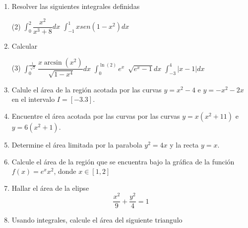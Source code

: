 \documentclass[12pt]{article}
\newenvironment{preguntas}
{\begin{enumerate}\itemsep12pt
	}
	{
	\end{enumerate}
}
\begin{document}
\begin{preguntas}
\begin{tasks}
\task $\displaystyle\int (x+2)sen(x^2+4x-6)dx$
\task $\displaystyle\int \dfrac{3x}{\sqrt[3]{x^2+3}}dx$
\task $\displaystyle\int \dfrac{e^x-1}{e^x+1}dx$
\end{tasks}
\item Resolver las siguientes integrales definidas
\begin{tasks}(2)
\task $\displaystyle\int_0^2 \dfrac{x^2}{x^3+8} dx$
\task $\displaystyle\int_{-1}^1 xsen(1-x^2)dx$
\end{tasks}
\item Calcular
\begin{tasks}(3)
\task $\displaystyle\int_0^{\frac{1}{\sqrt[]{2}}} \dfrac{x \arcsin(x^2)}{\sqrt[]{1-x^4}}dx$
\task $\displaystyle\int_0^{\ln(2)} e^x\ \sqrt[]{e^x-1}dx$
\task $\displaystyle\int_{-3}^{4} |x-1|dx$
\end{tasks}
\item Calule el área de la región acotada por las curvas $y=x^2-4$ e $y = -x^2-2x$ en el intervalo $I =  [-3.3]$.
\item Encuentre el área acotada por las curvas por las curvas $y=x(x^2+11)$ e $y=6(x^2+1)$.
\item Determine el área limitada por la parabola $y^2=4x$ y la recta $y=x$.
\item Calcule el área de la región que se encuentra bajo la gráfica de la función $f(x) = e^xx^2$, donde $x \in [1,2]$
\item Hallar el área de la elipse
	$$\dfrac{x^2}{9} + \dfrac{y^2}{4} = 1$$
\item Usando integrales, calcule el área del siguiente triangulo
	\begin{center}
	\end{center}
\end{preguntas}
\end{document}
